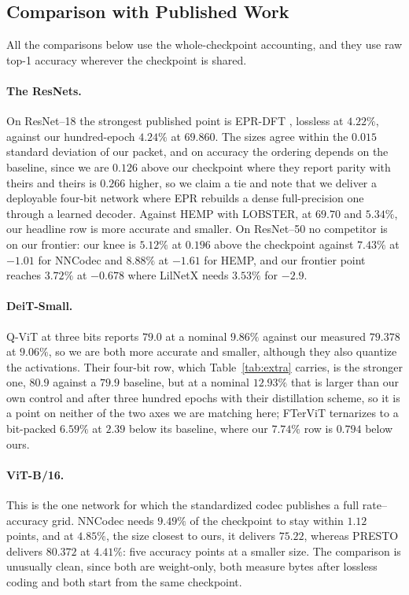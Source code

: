 \documentclass{article}
\begin{document}
\subsection{Comparison with Published Work}
\label{sec:comparison}

All the comparisons below use the whole-checkpoint accounting, and they use raw
top-1 accuracy wherever the checkpoint is shared.

\paragraph{The ResNets.} On ResNet--18 the strongest published point is EPR-DFT
\citep{oktay2020epr}, lossless at $4.22\%$, against our hundred-epoch $4.24\%$ at
$69.860$. The
sizes agree within the $0.015$ standard deviation of our packet, and on accuracy
the ordering depends on the baseline, since we are $0.126$ above our checkpoint
where they report parity with theirs and theirs is $0.266$ higher, so we claim a
tie and note that we deliver a deployable four-bit network where EPR rebuilds a
dense full-precision one through a learned decoder. Against HEMP with LOBSTER, at
$69.70$ and $5.34\%$, our headline row is more accurate and smaller. On ResNet--50
no competitor is on our frontier: our knee is $5.12\%$ at $0.196$ above the
checkpoint against $7.43\%$ at $-1.01$ for NNCodec and $8.88\%$ at $-1.61$ for
HEMP, and our frontier point reaches $3.72\%$ at $-0.678$ where LilNetX needs
$3.53\%$ for $-2.9$.

\paragraph{DeiT-Small.} Q-ViT \citep{li2022qvit} at three bits reports $79.0$ at
a nominal $9.86\%$ against our measured $79.378$ at $9.06\%$, so we are both more
accurate and smaller, although they also quantize the activations. Their four-bit
row, which Table~\ref{tab:extra} carries, is the stronger one, $80.9$ against a
$79.9$ baseline, but at a nominal $12.93\%$ that is larger than our own control
and after three hundred epochs with their distillation scheme, so it is a point on
neither of the two axes we are matching here; FTerViT
\citep{rucinski2026ftervit} ternarizes to a bit-packed $6.59\%$ at $2.39$ below
its baseline, where our $7.74\%$ row is $0.794$ below ours.

\paragraph{ViT-B/16.} This is the one network for
which the standardized codec publishes a full rate--accuracy grid. NNCodec needs
$9.49\%$ of the checkpoint to stay within $1.12$ points, and at $4.85\%$, the size
closest to ours, it delivers $75.22$, whereas PRESTO delivers $80.372$ at
$4.41\%$: five accuracy points at a smaller size. The comparison is unusually
clean, since both are weight-only, both measure bytes after lossless coding and
both start from the same checkpoint.
\end{document}
